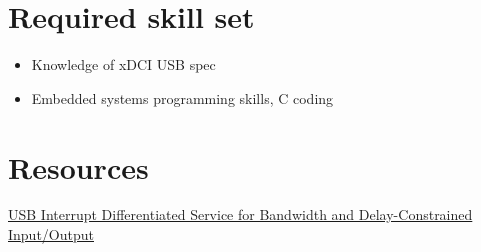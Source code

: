 \documentclass[11pt]{article}
\begin{document}
\section{Required skill set}
\label{sec:org374e33a}
\begin{itemize}
\item Knowledge of xDCI USB spec
\item Embedded systems programming skills, C coding
\end{itemize}
\section{Resources}
\label{sec:orgd2f4bcf}
\href{https://www.cs.bu.edu/\~richwest/papers/rtas2024-final-revised.pdf}{USB Interrupt Differentiated Service for Bandwidth and Delay-Constrained Input/Output}
\end{document}
